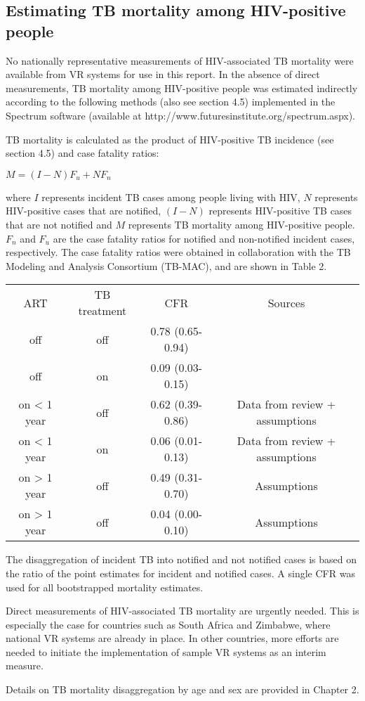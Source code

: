 \subsection{Estimating TB mortality among HIV-positive people}

No nationally representative measurements of HIV-associated TB mortality were available from VR systems for use in this report. In the absence of direct measurements, TB mortality among HIV-positive people was estimated indirectly according to the following methods (also see section 4.5) implemented in the Spectrum software (available at http://www.futuresinstitute.org/spectrum.aspx).

TB mortality is calculated as the product of HIV-positive TB incidence (see section 4.5) and case fatality ratios:

$M = (I-N)F_u + NF_n$ 									

where $I$ represents incident TB cases among people living with HIV, $N$ represents HIV-positive cases that are notified, $(I-N)$ represents HIV-positive TB cases that are not notified and $M$ represents TB mortality among HIV-positive people. $F_n$ and $F_u$ are the case fatality ratios for notified and non-notified incident cases, respectively. The case fatality ratios were obtained in collaboration with the TB Modeling and Analysis Consortium (TB-MAC), and are shown in Table 2.

\begin{table} 
    \begin{tabular}{ c c c c }
        ART & TB treatment & CFR & Sources \\ 
        off & off & 0.78 (0.65-0.94) &  \cite{12742798} \\ 
        off & on  & 0.09 (0.03-0.15) & \cite{21738585} \cite{11216921}\\ 
        on < 1 year & off & 0.62 (0.39-0.86) & Data from review + assumptions \\ 
        on < 1 year & on  &  0.06 (0.01-0.13) & Data from review + assumptions \\ 
        on > 1 year & off & 0.49 (0.31-0.70) & Assumptions \\ 
        on > 1 year & off & 0.04 (0.00-0.10) & Assumptions \\ 
    \end{tabular} 
\end{table}

The disaggregation of incident TB into notified and not notified cases is based on the ratio of the point estimates for incident and notified cases. A single CFR was used for all bootstrapped mortality estimates.

Direct measurements of HIV-associated TB mortality are urgently needed. This is especially the case for countries such as South Africa and Zimbabwe, where national VR systems are already in place. In other countries, more efforts are needed to initiate the implementation of sample VR systems as an interim measure.

Details on TB mortality disaggregation by age and sex are provided in Chapter 2.



